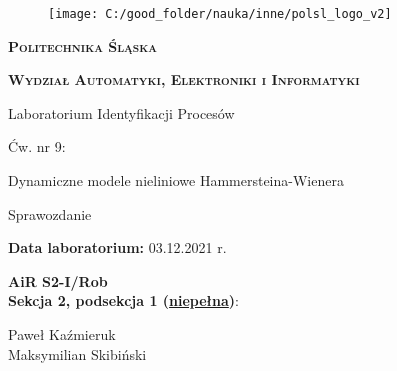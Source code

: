\documentclass[11pt, a4paper]{article}
\begin{document}

\begin{titlepage}
{\LARGE
\begin{center}
	\begin{figure}[h!]
		\centering
		\texttt{[image: C:/good\_folder/nauka/inne/polsl\_logo\_v2]}
	\end{figure}
	
	\vspace{0.25cm}
	
	\textbf{\textsc{Politechnika Śląska}}
	
	\textbf{\textsc{Wydział Automatyki, Elektroniki i Informatyki}}
	
	\vspace{1.5cm}
	
	Laboratorium Identyfikacji Procesów
	
	\vspace{1.5cm}
	
	Ćw. nr 9:
	
	Dynamiczne modele nieliniowe Hammersteina-Wienera
	
	\vspace{0.5cm}
	
	{\Large Sprawozdanie}
\end{center}
}

\vfill

{\Large
\noindent
\textbf{Data laboratorium:} 03.12.2021 r.

\vspace{0.5cm}

\noindent
\textbf{AiR S2-I/Rob}\\
\textbf{Sekcja 2, podsekcja 1 (\underline{niepełna})}:

\noindent
\hspace*{0.5cm} Paweł Kaźmieruk\\
\hspace*{0.5cm} Maksymilian Skibiński\\


\vspace{0.5cm}
}

\begin{center}
\end{center}
\end{titlepage}

\setcounter{page}{2}

\newpage
\end{document}
